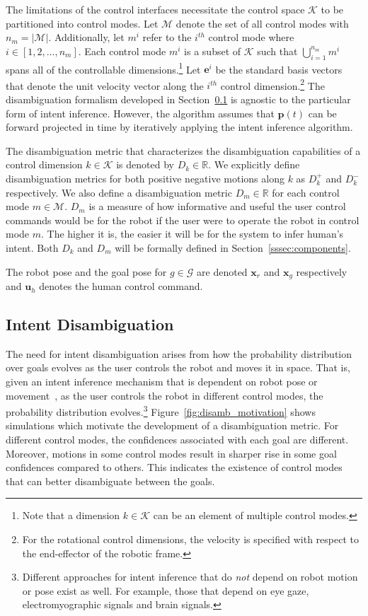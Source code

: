 The limitations of the control interfaces necessitate the control space $\mathcal{K}$ to be partitioned into control modes. Let $\mathcal{M}$ denote the set of all control modes with $n_m = \vert\mathcal{M}\vert$. Additionally, let $m^i$ refer to the $i^{th}$ control mode where $i \in [1,2,\dots,n_m]$. Each control mode $m^i$ is a subset of $\mathcal{K}$ such that $\bigcup\limits_{i=1}^{n_m} m^i$ spans all of the controllable dimensions.\footnote{Note that a dimension $k \in \mathcal{K}$ can be an element of multiple control modes.} Let $\boldsymbol{e}^i$ be the standard basis vectors that denote the unit velocity vector along the $i^{th}$ control dimension.\footnote{For the rotational control dimensions, the velocity is specified with respect to the end-effector of the robotic frame.} The disambiguation formalism developed in Section~\ref{ssec:disamb} is agnostic to the particular form of intent inference. However, the algorithm assumes that $\boldsymbol{p}(t)$ can be forward projected in time by iteratively applying the intent inference algorithm. 

The disambiguation metric that characterizes the disambiguation capabilities of a control dimension $k \in \mathcal{K}$ is denoted by $D_k \in \mathbb{R}$. We explicitly define disambiguation metrics for both positive negative motions along $k$ as $D_k^{+}$ and $D_k^{-}$ respectively. We also define a disambiguation metric $D_m \in \mathbb{R}$ for each control mode $m \in \mathcal{M}$. $D_m$ is a measure of how informative and useful the user control commands would be for the robot if the user were to operate the robot in control mode $m$. The higher it is, the easier it will be for the system to infer human's intent. Both $D_k$ and $D_m$ will be formally defined in Section~\ref{sssec:components}.

The robot pose and the goal pose for $g \in \mathcal{G}$ are denoted $\boldsymbol{x}_r$ and $\boldsymbol{x}_g$ respectively and $\boldsymbol{u}_h$ denotes the human control command.
\subsection{Intent Disambiguation}\label{ssec:disamb} 
The need for intent disambiguation arises from how the probability distribution over goals evolves as the user controls the robot and moves it in space. That is, given an intent inference mechanism that is dependent on robot pose or movement~\citep{kelley2008understanding, wang2013probabilistic}, as the user controls the robot in different control modes, the probability distribution evolves.\footnote{Different approaches for intent inference that do \textit{not} depend on robot motion or pose exist as well. For example, those that depend on eye gaze, electromyographic signals and brain signals.} Figure~\ref{fig:disamb_motivation} shows simulations which motivate the development of a disambiguation metric. For different control modes, the confidences associated with each goal are different. Moreover, motions in some control modes result in sharper rise in some goal confidences compared to others. This indicates the existence of control modes that can better disambiguate between the goals. 

